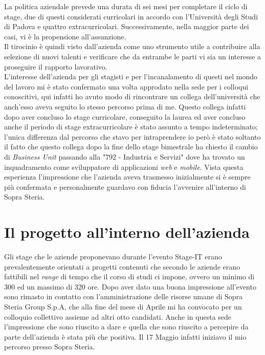 La politica aziendale prevede una durata di sei mesi per completare il ciclo di stage, due di questi considerati curricolari in accordo con l'Università degli Studi di Padova e quattro extracurricolari. Successivamente, nella maggior parte dei casi, vi è la propensione all'assunzione.\\%

Il tirocinio è quindi visto dall'azienda come uno strumento utile a contribuire alla selezione di nuovi talenti e verificare che da entrambe le parti vi sia un interesse a proseguire il rapporto lavorativo.\\

L'interesse dell'azienda per gli stagisti e per l'incanalamento di questi nel mondo del lavoro mi è stato confermato una volta approdato nella sede per i colloqui conoscitivi, qui infatti ho avuto modo di rincontrare un collega dell'università che anch'esso aveva seguito lo stesso percorso prima di me. Questo collega infatti dopo aver concluso lo stage curricolare, conseguito la laurea ed aver concluso anche il periodo di stage extracurricolare è stato assunto a tempo indeterminato; l'unica differenza dal percorso che stavo per intraprendere io però è stato soltanto il fatto che questo collega dopo la fine dello stage bimestrale ha chiesto il cambio di \textit{Business Unit} passando alla "792 - Industria e Servizi" dove ha trovato un inquadramento come sviluppatore di applicazioni \textit{web} e \textit{mobile}. Vista questa esperienza l'impressione che l'azienda aveva trasmesso inizialmente si è sempre più confermata e personalmente guardavo con fiducia l'avvenire all'interno di Sopra Steria.

\section{Il progetto all'interno dell'azienda}

Gli stage che le aziende proponevano durante l'evento Stage-IT erano prevalentemente orientati a progetti contenuti che secondo le aziende erano fattibili nel \textit{range} di tempo che il corso di studi ci impone, ovvero un minimo di 300 ed un massimo di 320 ore. Dopo aver dato una buona impressione all'evento sono rimasto in contatto con l'amministrazione delle risorse umane di Sopra Steria Group S.p.A, che alla fine del mese di Aprile mi ha convocato per un colloquio collettivo assieme ad altri otto candidati. Anche in questa sede l'impressione che sono riuscito a dare e quella che sono riuscito a percepire da parte dell'azienda è stata più che positiva. Il 17 Maggio infatti iniziavo il mio percorso presso Sopra Steria.\\


